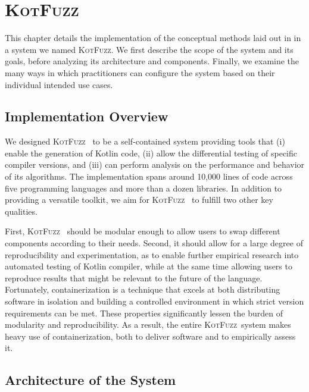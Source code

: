 \newcommand{\kf}{\textsc{KotFuzz}}

\chapter{\label{cha:tool} \kf}

This chapter details the implementation of the conceptual methods
laid out in  in a system
we named \kf.
We first describe the scope of the system and its goals,
before analyzing its architecture and components.
Finally, we examine the many ways in which practitioners
can configure the system based on their individual intended use cases.

\section{\label{sec:overview}Implementation Overview}

We designed \kf~ to be a self-contained system providing tools
that (i) enable the generation of Kotlin code,
(ii) allow the differential testing of specific compiler versions,
and (iii) can perform analysis on the performance
and behavior of its algorithms.
The implementation spans around 10,000 lines of code
across five programming languages and more than a dozen libraries.
In addition to providing a versatile toolkit, we aim for
\kf~ to fulfill two other key qualities.

First, \kf~ should be modular enough to allow users
to swap different components according to their needs.
Second, it should allow for a large degree of reproducibility
and experimentation, as to enable further empirical research into 
automated testing of Kotlin compiler, while at the same time
allowing users to reproduce results that might be relevant to the
future of the language.
Fortunately, containerization is a technique that excels
at both distributing software in isolation and building a controlled
environment in which strict version requirements can be met.
These properties significantly lessen the burden of modularity
and reproducibility.
As a result, the entire \kf~system makes heavy use of containerization,
both to deliver software and to empirically assess it.


\section{\label{sec:architecture}Architecture of the System}


